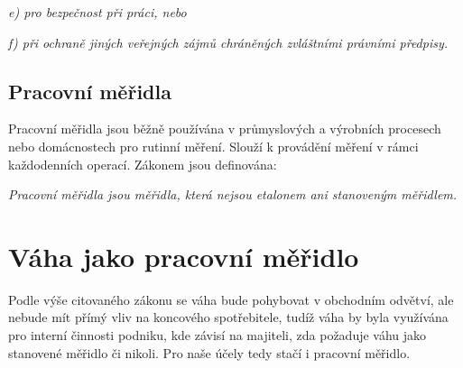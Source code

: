 \textit{e) pro bezpečnost při práci, nebo}

\textit{f) při ochraně jiných veřejných zájmů chráněných zvláštními právními předpisy.} \cite{Zákon o metrologii}

\subsection{Pracovní měřidla}
Pracovní měřidla jsou běžně používána v průmyslových a výrobních procesech nebo domácnostech pro rutinní měření. Slouží k provádění měření v rámci každodenních operací. Zákonem jsou definována:

\textit{Pracovní měřidla jsou měřidla, která nejsou etalonem ani stanoveným měřidlem.} \cite{Zákon o metrologii}


\section{Váha jako pracovní měřidlo}
\label{meridlo}
Podle výše citovaného zákonu se váha bude pohybovat v obchodním odvětví, ale nebude mít přímý vliv na koncového spotřebitele, tudíž váha by byla využívána pro interní činnosti podniku, kde závisí na majiteli, zda požaduje váhu jako stanovené měřidlo či nikoli. Pro naše účely tedy stačí i pracovní měřidlo.



